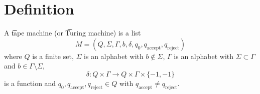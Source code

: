 
\section*{Definition}

A \t{tape machine} (or \t{Turing machine}) is a list
\[
M = (Q, \Sigma , \Gamma , b, \delta , q_0, q_{\text{accept}}, q_{\text{reject}})
\]
where $Q$ is a finite set, $\Sigma $ is an alphabet with $b \not\in \Sigma $, $\Gamma $ is an alphabet with $\Sigma  \subset \Gamma $ and $b \in \Gamma  \setminus \Sigma $,
\[
\delta : Q \times  \Gamma  \to Q \times  \Gamma  \times  \{-1, -1\}
\]
is a function and $q_0, q_{\text{accept}}, q_{\text{reject}} \in Q$ with $q_{\text{accept}} \neq q_{\text{reject}}$.

\blankpage
